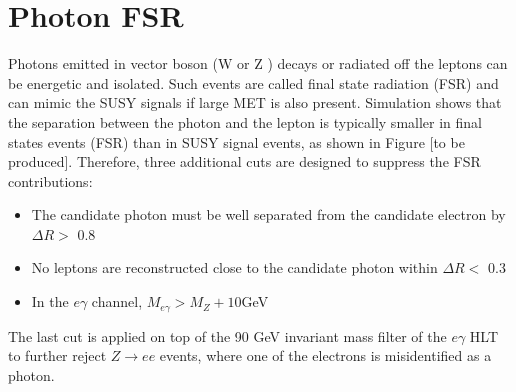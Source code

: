 \documentclass[thesis.tex]{subfiles}
\renewcommand\_{\textunderscore\allowbreak}
\begin{document}
\section{Photon FSR}
  Photons emitted in vector boson (W or Z ) decays or radiated off the leptons can be energetic and isolated. Such events are called final state radiation (FSR) and can mimic the SUSY signals if large MET is also present. Simulation shows that the separation between the photon and the lepton is typically smaller in final states events (FSR) than in SUSY signal events, as shown in Figure [to be produced]. Therefore, three additional cuts are designed to suppress the FSR contributions:
\begin{itemize}
\item The candidate photon must be well separated from the candidate electron by $\Delta R >$ 0.8
\item No leptons are reconstructed close to the candidate photon within $\Delta R <$ 0.3
\item In the $e\gamma$ channel, $M_{e\gamma} > M_Z + 10 $GeV 
\end{itemize}

The last cut is applied on top of the 90 GeV invariant mass filter of the $e\gamma$ HLT to further reject $Z\rightarrow ee$ events, where one of the electrons is misidentified as a photon.
\end{document}
